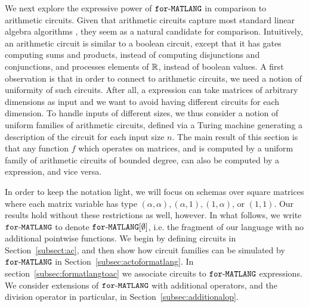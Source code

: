 We next explore the expressive power of $\texttt{for}\text{-}\texttt{MATLANG}$ in comparison to arithmetic circuits.
Given that arithmetic circuits capture most standard linear algebra algorithms \cite{Raz02,ShpilkaY10}, 
they seem as a natural candidate for comparison. Intuitively, an arithmetic circuit is similar to
a boolean circuit,
except that it has gates computing  sums and products, 
instead of computing disjunctions and conjunctions, and processes elements of $\mathbb{R}$, 
instead of boolean values. 
%
A first observation is that in order to connect \langfor to arithmetic circuits, we need a 
notion of uniformity of such circuits. After all, a \langfor expression can take matrices 
of arbitrary dimensions as input and we want to avoid having different circuits for each dimension.
To handle inputs of different sizes, we thus consider a notion of uniform families of arithmetic circuits,
defined via a Turing machine generating a description of the circuit for each input size $n$.
The main result of this section is that any function $f$ which operates on matrices, and is computed 
by a uniform family of arithmetic circuits of bounded degree, can also be computed by a \langfor expression,
and vice versa.

 In order to keep the notation light, we will focus on \langfor schemas over 
square matrices where each matrix variable has type $(\alpha,\alpha),(\alpha,1),(1,\alpha)$, or $(1,1)$.
Our results hold without these restrictions as well, however. 
In what follows, we write $\texttt{for}\text{-}\texttt{MATLANG}$ to denote $\texttt{for}\text{-}\texttt{MATLANG}[\emptyset]$, i.e. the fragment of our language 
with no additional pointwise functions. 
We begin by defining circuits in Section~\ref{subsect:ac}, and then show how circuit families can be simulated by $\texttt{for}\text{-}\texttt{MATLANG}$ in Section~\ref{subsec:actoformatlang}. In section~\ref{subsec:formatlangtoac} we associate 
circuits to $\texttt{for}\text{-}\texttt{MATLANG}$ expressions. We consider 
extensions of $\texttt{for}\text{-}\texttt{MATLANG}$ with additional operators, and the division operator in particular, in Section~\ref{subsec:additionalop}.

